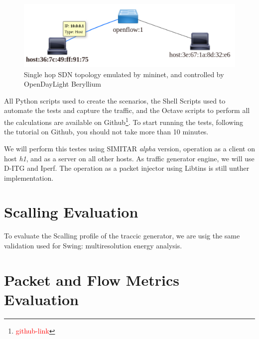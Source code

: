 \begin{figure}[!ht]
	\centering
	\includegraphics[scale=0.4]{figures/ch5/topo-simple}
	\caption{Single hop SDN topology emulated by mininet, and controlled by OpenDayLight Beryllium}
	\label{fig:topo-simple}
\end{figure}

All Python scripts used to create the scenarios, the Shell Scripts used to automate the tests and capture the traffic, and the Octave scripts to perform all the calculations are available on Github\footnote{\textcolor{red}{github-link}}. To start running the tests, following the tutorial on Github, you should not take more than 10 minutes.

We will perform this testes using SIMITAR \textit{alpha} version, operation as a client on host \textit{h1}, and as a server on all other hosts. As traffic generator engine, we will use D-ITG and Iperf. The operation as a packet injector using Libtins is still unther implementation.

\section{Scalling Evaluation}


To evaluate the Scalling profile of the traccic generator, we are usig the same validation used for Swing\cite{swing-paper}: multiresolution energy analysis.


\section{Packet and Flow Metrics Evaluation}